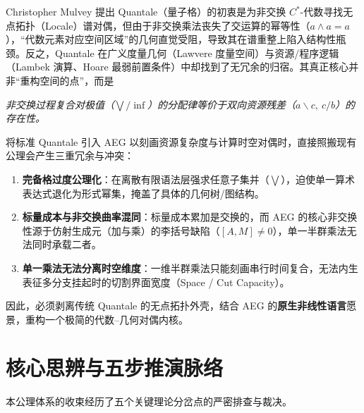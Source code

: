\documentclass[11pt,a4paper]{ctexart}
\theoremstyle{plain}
\theoremstyle{definition}
\begin{document}
Christopher Mulvey 提出 Quantale（量子格）的初衷是为非交换 $C^*$-代数寻找无点拓扑（Locale）谱对偶，但由于非交换乘法丧失了交运算的幂等性（$a \wedge a = a$），“代数元素对应空间区域”的几何直觉受阻，导致其在谱重整上陷入结构性瓶颈。反之，Quantale 在广义度量几何（Lawvere 度量空间）与资源/程序逻辑（Lambek 演算、Hoare 最弱前置条件）中却找到了无冗余的归宿。其真正核心并非“重构空间的点”，而是
\begin{center}
\emph{非交换过程复合对极值（$\bigvee/\inf$）的分配律等价于双向资源残差（$a \backslash c,\ c / b$）的存在性。}
\end{center}

将标准 Quantale 引入 AEG 以刻画资源复杂度与计算时空对偶时，直接照搬现有公理会产生三重冗余与冲突：

\begin{enumerate}
\item \textbf{完备格过度公理化}：在离散有限语法层强求任意子集并（$\bigvee$），迫使单一算术表达式退化为形式幂集，掩盖了具体的几何树/图结构。
\item \textbf{标量成本与非交换曲率混同}：标量成本累加是交换的，而 AEG 的核心非交换性源于仿射生成元（加与乘）的李括号缺陷（$[A, M] \neq 0$），单一半群乘法无法同时承载二者。
\item \textbf{单一乘法无法分离时空维度}：一维半群乘法只能刻画串行时间复合，无法内生表征多分支挂起时的切割界面宽度（Space / Cut Capacity）。
\end{enumerate}

因此，必须剥离传统 Quantale 的无点拓扑外壳，结合 AEG 的\textbf{原生非线性语言}愿景，重构一个极简的代数--几何对偶内核。

\section{核心思辨与五步推演脉络}

本公理体系的收束经历了五个关键理论分岔点的严密排查与裁决。
\end{document}
